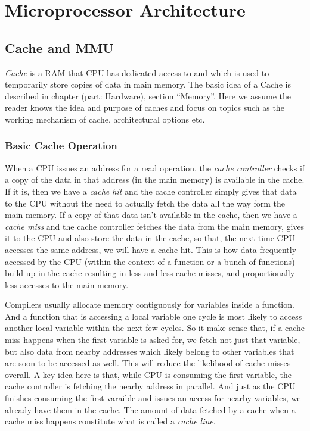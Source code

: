 \chapter{Microprocessor Architecture}
\label{chap:upArch}
\section{Cache and MMU}
\emph{Cache} is a RAM that CPU has dedicated access to and which is used to temporarily store copies of data in main memory. The basic idea of a Cache is described in  chapter (part: Hardware), section ``Memory''. Here we assume the reader knows the idea and purpose of caches and focus on topics such as the working mechanism of cache, architectural options etc.

\subsection{Basic Cache Operation}
When a CPU issues an address for a read operation, the \emph{cache controller} checks if a copy of the data in that address (in the main memory) is available in the cache. If it is, then we have a \emph{cache hit} and the cache controller simply gives that data to the CPU without the need to actually fetch the data all the way form the main memory. If a copy of that data isn't available in the cache, then we have a \emph{cache miss} and the cache controller fetches the data from the main memory, gives it to the CPU and also store the data in the cache, so that, the next time CPU accesses the same address, we will have a cache hit. This is how data frequently accessed by the CPU (within the context of a function or a bunch of functions) build up in the cache resulting in less and less cache misses, and proportionally less accesses to the main memory. 
 
Compilers usually allocate memory contiguously for variables inside a function. And a function that is accessing a local variable one cycle is most likely to access another local variable within the next few cycles. So it make sense that, if a cache miss happens when the first variable is asked for, we fetch not just that variable, but also data from nearby addresses which likely belong to other variables that are soon to be accessed as well. This will reduce the likelihood of cache misses overall. A key idea here is that, while CPU is consuming the first variable, the cache controller is fetching the nearby address in parallel. And just as the CPU finishes consuming the first varaible and issues an access for nearby variables, we already have them in the cache. The amount of data fetched by a cache when a cache miss happens constitute what is called a \emph{cache line}. 
 
